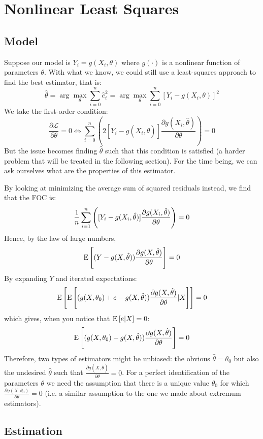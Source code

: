 \section{Nonlinear Least Squares}

\subsection{Model}

Suppose our model is $Y_i = g(X_i, \theta)$ where $g(\cdot)$ is a nonlinear function of parameters $\theta$. With what we know, we could still use a least-squares approach to find the best estimator, that is: $$\hat\theta = \arg\max_{\theta} \sum_{i=0}^{n} \hat e_i^2 = \arg\max_{\theta} \sum_{i=0}^{n} [Y_i - g(X_i, \theta)]^2 $$ We take the first-order condition: $$\frac{\partial \mathcal{L}}{\partial \theta} = 0 \Leftrightarrow \sum_{i=0}^{n} \left(2[Y_i - g(X_i, \hat\theta)]\frac{\partial g(X_i, \hat\theta)}{\partial  \theta}\right) = 0 $$ But the issue becomes finding $\hat\theta$ such that this condition is satisfied (a harder problem that will be treated in the following section). For the time being, we can ask ourselves what are the properties of this estimator.

By looking at minimizing the average sum of squared residuals instead, we find that the FOC is: $$ \frac{1}{n} \sum_{i=1}^{n} \left([Y_i - g(X_i, \hat\theta)]\frac{\partial g(X_i, \hat\theta)}{\partial  \theta}\right) = 0 $$ Hence, by the law of large numbers, $$\operatorname{E}\left[(Y - g(X, \hat\theta))\frac{\partial g(X, \hat\theta)}{\partial  \theta}\right] = 0$$ By expanding $Y$ and iterated expectations: $$\operatorname{E}\left[\operatorname{E}\left[(g(X, \theta_0) + e - g(X, \hat\theta))\frac{\partial g(X, \hat\theta)}{\partial  \theta}\vert X\right]\right] = 0$$ which gives, when you notice that $\operatorname{E}\left[e\vert X\right] = 0 $: $$\operatorname{E}\left[(g(X, \theta_0) - g(X, \hat\theta))\frac{\partial g(X, \hat\theta)}{\partial  \theta}\right] = 0 $$ Therefore, two types of estimators might be unbiased: the obvious $\hat \theta = \theta_0$ but also the undesired $\hat\theta$ such that $\frac{\partial g(X,\hat\theta)}{\partial \theta} = 0$. For a perfect identification of the parameters $\theta$ we need the assumption that there is a unique value $\theta_0$ for which $\frac{\partial g(X,\theta_0)}{\partial \theta} = 0$ (i.e. a similar assumption to the one we made about extremum estimators).

\subsection{Estimation}


